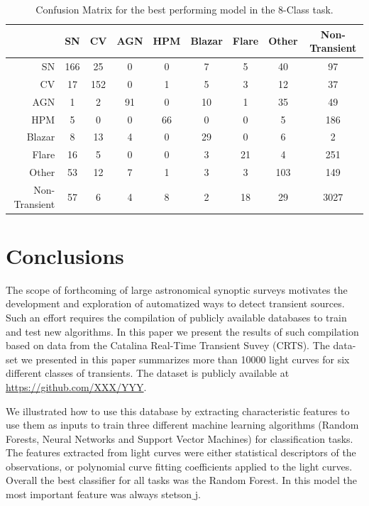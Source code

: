 \documentclass[a4paper,fleqn,usenatbib]{mnras}
\begin{document}
\begin{table}
\centering
\begin{tabular}{|r|c|c|c|c|c|c|c|c|}
\hline
\multicolumn{1}{|l|}{} & SN    & CV    & AGN   & HPM   & Blazar   & Flare   & Other   & Non-Transient  \\ \hline \hline
SN            & 166  &  25  &  0  &  0  &  7   &  5  &  40 &   97 \\ \hline
CV            &  17  & 152  &  0  &  1  &  5   &  3  &  12 &   37 \\ \hline
AGN           &   1  &   2  & 91  &  0  & 10   &  1  &  35 &   49 \\ \hline
HPM           &   5  &   0  &  0  & 66  &  0   &  0  &   5 &  186 \\ \hline
Blazar        &   8  &  13  &  4  &  0  & 29   &  0  &   6 &    2 \\ \hline
Flare         &  16  &   5  &  0  &  0  &  3   & 21  &   4 &  251 \\ \hline
Other         &  53  &  12  &  7  &  1  &  3   &  3  & 103 &  149 \\ \hline
Non-Transient &  57  &   6  &  4  &  8  &  2   & 18  &  29 & 3027 \\ \hline
\end{tabular}
\caption{Confusion Matrix for the best performing model in the 8-Class task.}
\label{Confusion-8-Class}
\end{table}



\section{Conclusions}

The scope of forthcoming of large astronomical synoptic surveys 
motivates the development and exploration of automatized ways to
detect transient sources. 
Such an effort requires the compilation of publicly available
databases to train and test new algorithms.
In this paper we present the results of such compilation based on data
from the Catalina Real-Time Transient Suvey (CRTS).
The data-set we presented in this paper summarizes more than 10000
light curves for six different classes of transients.
The dataset is publicly available at
\url{https://github.com/XXX/YYY}.   


We illustrated how to use this database by extracting 
characteristic features to use them as inputs to train three different
machine learning algorithms (Random Forests, Neural Networks and
Support Vector Machines) for classification tasks.
The features extracted from light curves were either statistical
descriptors of the observations, or polynomial curve fitting
coefficients applied to the light curves.   
Overall the best classifier for all tasks was the Random Forest.
In this model the most important feature was always stetson$\_$j.
\end{document}
